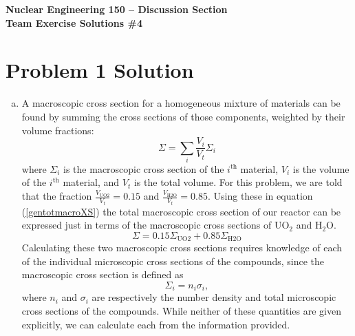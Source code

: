 \documentclass{report}
\begin{document}
\begin{center}
\textbf{\large Nuclear Engineering 150 -- Discussion Section}\\ 
\textbf{Team Exercise Solutions \#4}
\end{center}



\section*{Problem 1 Solution}


\begin{enumerate}[a)]

\item 

A macroscopic cross section for a homogeneous mixture of materials can be found by summing the cross sections of those components, weighted by their volume fractions: 
\begin{equation}
\label{gentotmacroXS}
\Sigma = \sum_{i} \frac{V_i}{V_t}\Sigma_i
\end{equation}
where $\Sigma_i$ is the macroscopic cross section of the $i^{\text{th}}$ material, $V_i$ is the volume of the $i^{\text{th}}$ material, and $V_t$ is the total volume. For this problem, we are told that the fraction $\frac{V_{\text{UO2}}}{V_t} = 0.15$ and $\frac{V_{\text{H2O}}}{V_t} = 0.85$. Using these in equation (\ref{gentotmacroXS}) the total macroscopic cross section of our reactor can be expressed just in terms of the macroscopic cross sections of UO$_2$ and H$_2$O.
\begin{equation}
\label{totmacroXS}
\Sigma = 0.15\Sigma_{\text{UO2}} + 0.85\Sigma_{\text{H2O}}
\end{equation}
Calculating these two macroscopic cross sections requires knowledge of each of the individual microscopic cross sections of the compounds, since the macroscopic cross section is defined as
\begin{equation}
\label{macroXSi}
\Sigma_i = n_i\sigma_i ,
\end{equation}
where $n_i$ and $\sigma_i$ are respectively the number density and total microscopic cross sections of the compounds. While neither of these quantities are given explicitly, we can calculate each from the information provided. 
\-\\


\end{enumerate}
\end{document}
